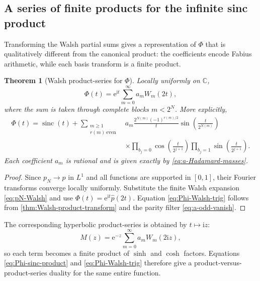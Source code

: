 \documentclass[11pt,oneside]{article}
\newtheorem{theorem}{Theorem}[section]
\theoremstyle{definition}
\theoremstyle{remark}
\newcommand{\C}{\mathbb C}
\newcommand{\sinc}{\operatorname{sinc}}
\newcommand{\e}{\mathrm e}
\newcommand{\ii}{\mathrm i}
\begin{document}
\subsection{A series of finite products for the infinite sinc product}

Transforming the Walsh partial sums gives a representation of $\Phi$ that is
qualitatively different from the canonical product: the coefficients encode
Fabius arithmetic, while each basis transform is a finite product.

\begin{theorem}[Walsh product-series for $\Phi$]
\label{thm:Phi-Walsh-product-series}
Locally uniformly on $\C$,
\begin{equation}\label{eq:Phi-Walsh-basic}
 \Phi(t)=\e^{\ii t}\sum_{m=0}^\infty a_mW_m(2t),
\end{equation}
where the sum is taken through complete blocks $m<2^N$.  More explicitly,
\begin{align}
 \Phi(t)=\sinc(t)
 +\sum_{\substack{m\ge1\\r(m)\ \mathrm{even}}}
 &a_m\frac{2^{N(m)}(-1)^{r(m)/2}}{t}
 \sin\!\left(\frac{t}{2^{N(m)}}\right)
 \label{eq:Phi-Walsh-trig}\\[-0.3em]
 &\times
 \prod_{b_j=0}\cos\!\left(\frac{t}{2^{j+1}}\right)
 \prod_{b_j=1}\sin\!\left(\frac{t}{2^{j+1}}\right).
 \nonumber
\end{align}
Each coefficient $a_m$ is rational and is given exactly by
\eqref{eq:a-Hadamard-masses}.
\end{theorem}

\begin{proof}
Since $p_N\to p$ in $L^1$ and all functions are supported in $[0,1]$, their
Fourier transforms converge locally uniformly.  Substitute the finite Walsh
expansion \eqref{eq:pN-Walsh} and use
$\Phi(t)=\e^{\ii t}\widehat p(2t)$.  Equation
\eqref{eq:Phi-Walsh-trig} follows from
\cref{thm:Walsh-product-transform} and the parity filter
\eqref{eq:a-odd-vanish}.
\end{proof}

The corresponding hyperbolic product-series is obtained by $t\mapsto\ii z$:
\begin{equation}\label{eq:M-Walsh}
 M(z)=\e^{-z}\sum_{m=0}^\infty a_mW_m(2\ii z),
\end{equation}
so each term becomes a finite product of $\sinh$ and $\cosh$ factors.
Equations \eqref{eq:Phi-sinc-product} and \eqref{eq:Phi-Walsh-trig} therefore
give a product-versus-product-series duality for the same entire function.
\end{document}
